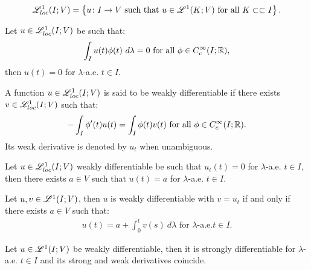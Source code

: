 \begin{definition}[$\Lp{1}_{loc}(I; V)$]
    \begin{gather}
        \mathscr{L}^{1}_{loc}(I; V) = \left\{ u\colon I \rightarrow V  \text{ such that } u \in \mathscr{L}^{1}(K; V) \text{ for all } K \subset \subset I \right\}.
    \end{gather}
\end{definition}

\begin{corollary}
    Let $u \in \mathscr{L}^{1}_{loc}(I; V)$ be such that:
    \begin{gather}
        \int_I u(t) \phi(t) ~ d \lambda = 0 \text{ for all } \phi \in C_c^{\infty}(I; \mathbb{R}),
    \end{gather}
    then $u(t) = 0$ for $\lambda$-a.e. $t \in I$.
\end{corollary}

\begin{definition}
    A function $u \in \mathscr{L}^{1}_{loc}(I; V)$ is said to be weakly differentiable if there exists $v \in \mathscr{L}^{1}_{loc}(I; V)$ such that:
    \begin{gather}
        - \int_I \phi^{\prime}(t) u(t) = \int_I \phi(t) v(t) \text{ for all } \phi \in C_c^{\infty}(I; \mathbb{R}).
    \end{gather}
    Its weak derivative is denoted by $u_t$ when unambiguous.
\end{definition}

\begin{lemma}
    Let $u \in \mathscr{L}^{1}_{loc}(I; V)$ weakly differentiable be such that $u_t(t) = 0$ for $\lambda$-a.e. $t \in I$, then there exists $a \in V$ such that $u(t) = a$ for $\lambda$-a.e. $t \in I$.
\end{lemma}

\begin{theorem}
    Let $u, v \in \mathscr{L}^{1}(I; V)$, then $u$ is weakly differentiable with $v = u_t$ if and only if there exists $a \in V$ such that:
    \begin{gather}
        u(t) = a + \int_0^t v(s) ~ d \lambda \text{ for } \lambda \text{-a.e.} t \in I.
    \end{gather}
\end{theorem}

\begin{corollary}
    Let $u \in \mathscr{L}^{1}(I; V)$ be weakly differentiable, then it is strongly differentiable for $\lambda$-a.e. $t \in I$ and its strong and weak derivatives coincide.
\end{corollary}

